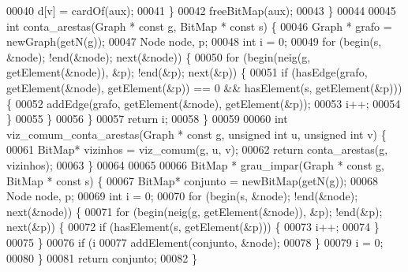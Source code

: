 \begin{DoxyCode}
00040                 d[v] = cardOf(aux);
00041         \}
00042         freeBitMap(aux);
00043 \}
00044 
00045 \textcolor{keywordtype}{int} conta_arestas(Graph * \textcolor{keyword}{const} g, BitMap * \textcolor{keyword}{const} s) \{
00046         Graph * grafo = newGraph(getN(g));      
00047         Node node, p;
00048         \textcolor{keywordtype}{int} i = 0;
00049         \textcolor{keywordflow}{for} (begin(s, &node); !end(&node); next(&node)) \{
00050                 \textcolor{keywordflow}{for} (begin(neig(g, getElement(&node)), &p); !end(&p); next(&p)) \{
00051                         \textcolor{keywordflow}{if} (hasEdge(grafo, getElement(&node), getElement(&p)) == 0 && 
      hasElement(s, getElement(&p))) \{
00052                                 addEdge(grafo, getElement(&node), getElement(&p));
00053                                 i++;
00054                         \}
00055                 \}
00056         \}               
00057         \textcolor{keywordflow}{return} i;
00058 \}
00059 
00060 \textcolor{keywordtype}{int} viz_comum_conta_arestas(Graph * \textcolor{keyword}{const} g, \textcolor{keywordtype}{unsigned} \textcolor{keywordtype}{int} u, \textcolor{keywordtype}{unsigned} \textcolor{keywordtype}{int} v) \{
00061         BitMap* vizinhos = viz_comum(g, u, v);  
00062         \textcolor{keywordflow}{return} conta_arestas(g, vizinhos);
00063 \}
00064 
00065 
00066 BitMap * grau_impar(Graph * \textcolor{keyword}{const} g, BitMap * \textcolor{keyword}{const} s) \{
00067         BitMap* conjunto = newBitMap(getN(g));
00068         Node node, p;
00069         \textcolor{keywordtype}{int} i = 0;
00070         \textcolor{keywordflow}{for} (begin(s, &node); !end(&node); next(&node)) \{
00071                 \textcolor{keywordflow}{for} (begin(neig(g, getElement(&node)), &p); !end(&p); next(&p)) \{
00072                         \textcolor{keywordflow}{if} (hasElement(s, getElement(&p))) \{
00073                                 i++;
00074                         \}
00075                 \}
00076                 \textcolor{keywordflow}{if} (i %
00077                         addElement(conjunto, &node);
00078                 \}
00079                 i = 0;
00080         \}
00081         \textcolor{keywordflow}{return} conjunto;
00082 \}
\end{DoxyCode}
